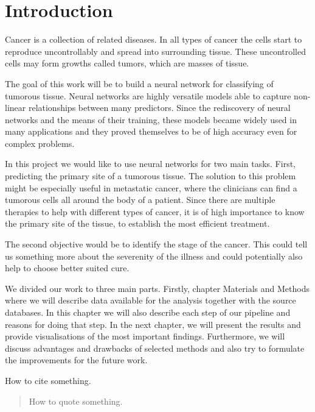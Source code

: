 \chapter*{Introduction}

Cancer is a collection of related diseases.
In all types of cancer the cells start to reproduce uncontrollably and spread into surrounding tissue.
These uncontrolled cells may form growths called tumors, which are masses of tissue.


The goal of this work will be to build a neural network for classifying of tumorous tissue.
Neural networks are highly versatile models able to capture non-linear relationships between many predictors.
Since the rediscovery of neural networks and the means of their training, these models became widely used in many applications and they proved themselves to be of high accuracy even for complex problems.

In this project we would like to use neural networks for two main tasks.
First, predicting the primary site of a tumorous tissue.
The solution to this problem might be especially useful in metastatic cancer, where the clinicians can find a tumorous cells all around the body of a patient.
Since there are multiple therapies to help with different types of cancer, it is of high importance to know the primary site of the tissue, to establish the most efficient treatment.

The second objective would be to identify the stage of the cancer.
This could tell us something more about the severenity of the illness and could potentially also help to choose better suited cure.

We divided our work to three main parts.
Firstly, chapter Materials and Methods where we will describe data available for the analysis together with the source databases. 
In this chapter we will also describe each step of our pipeline and reasons for doing that step.
In the next chapter, we will present the results and provide visualisations of the most important findings.
Furthermore, we will discuss advantages and drawbacks of selected methods and also try to formulate the improvements for the future work.


How to cite something\cite{smernica}.

\begin{quote}
How to quote something.
\end{quote}


